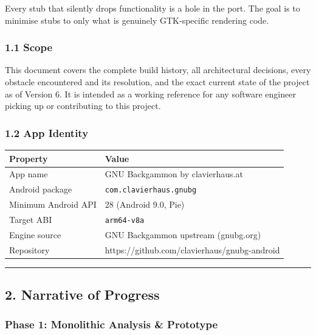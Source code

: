 \documentclass[11pt,a4paper]{article}
\begin{document}
Every stub that silently drops functionality is a hole in the port. The
goal is to minimise stubs to only what is genuinely GTK-specific
rendering code.

\subsubsection{1.1 Scope}\label{scope}

This document covers the complete build history, all architectural
decisions, every obstacle encountered and its resolution, and the exact
current state of the project as of Version 6. It is intended as a
working reference for any software engineer picking up or contributing
to this project.

\subsubsection{1.2 App Identity}\label{app-identity}

\begin{longtable}[]{@{}ll@{}}
\toprule\noalign{}
Property & Value \\
\midrule\noalign{}
\endhead
\bottomrule\noalign{}
\endlastfoot
App name & GNU Backgammon by clavierhaus.at \\
Android package & \texttt{com.clavierhaus.gnubg} \\
Minimum Android API & 28 (Android 9.0, Pie) \\
Target ABI & \texttt{arm64-v8a} \\
Engine source & GNU Backgammon upstream (gnubg.org) \\
Repository & https://github.com/clavierhaus/gnubg-android \\
\end{longtable}

\begin{center}\rule{0.5\linewidth}{0.5pt}\end{center}

\subsection{2. Narrative of Progress}\label{narrative-of-progress}

\subsubsection{Phase 1: Monolithic Analysis \&
Prototype}\label{phase-1-monolithic-analysis-prototype}
\end{document}
